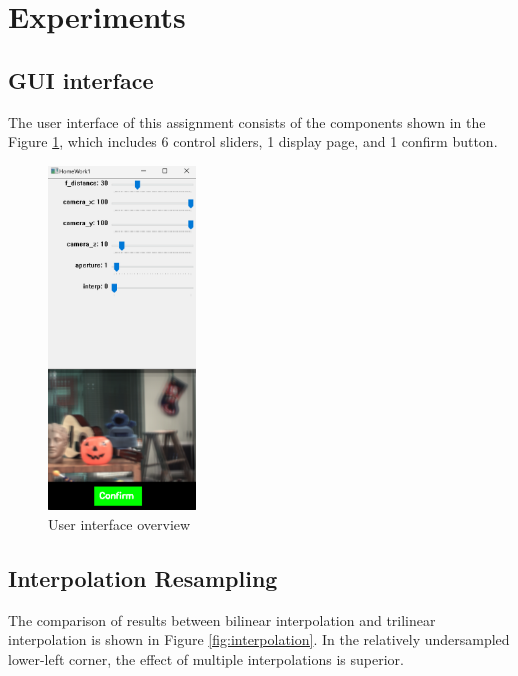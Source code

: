 \documentclass{article}
\begin{document}
\section{Experiments}
\subsection{GUI interface}
The user interface of this assignment consists of the components shown in the Figure \ref{fig:ui}, which includes 6 control sliders, 1 display page, and 1 confirm button.

\begin{figure}[h]
    \centering
    \includegraphics[width=0.35\textwidth]{GUI.png} %
    \caption{User interface overview}
    \label{fig:ui}
\end{figure}

\subsection{Interpolation Resampling}
The comparison of results between bilinear interpolation and trilinear interpolation is shown in Figure \ref{fig:interpolation}. In the relatively undersampled lower-left corner, the effect of multiple interpolations is superior.
\end{document}
